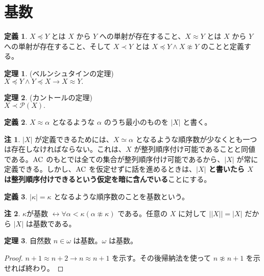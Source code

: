 \documentclass{jsarticle}
\theoremstyle{definition}
\newtheorem*{definition*}{定義}
\newtheorem{theorem}{定理}[section]
\newtheorem{remark}{注}[section]
\begin{document}
    \section{基数}
    \begin{definition*}
        $X \preceq Y$ とは $X$ から $Y$ への単射が存在すること、$X \approx Y$ とは $X$ から $Y$ への単射が存在すること、そして $X \prec Y$ とは $X \preceq Y \land X \not\approx Y$ のことと定義する。
    \end{definition*}
    \begin{theorem} \label{Bernstein} (ベルンシュタインの定理) \\
        $X \preceq Y \land Y \preceq X \rightarrow X \approx Y.$ 
    \end{theorem}
    \begin{theorem} \label{Cantor} (カントールの定理) \\
        $X \prec \mathcal{P}(X).$ 
    \end{theorem}
    \vspace{1ex}
    
    \begin{definition*}
        $X \approx \alpha$ となるような $\alpha$ のうち最小のものを $|X|$ と書く。
    \end{definition*}
    \begin{remark}
        $|X|$ が定義できるためには、$X \simeq \alpha$ となるような順序数が少なくとも一つは存在しなければならない。これは、$X$ が整列順序付け可能であることと同値である。$\rm AC$ のもとでは全ての集合が整列順序付け可能であるから、$|X|$ が常に定義できる。しかし、$\rm AC$ を仮定せずに話を進めるときは、{\bf $|X|$ と書いたら $X$ は整列順序付けできるという仮定を暗に含んでいる}ことにする。
    \end{remark}
    \begin{definition*}
        $|\kappa| = \kappa$ となるような順序数のことを基数という。
    \end{definition*}
    \begin{remark}
        $\kappa$が基数 $\leftrightarrow \forall \alpha < \kappa(\alpha \not\approx \kappa)$ である。任意の $X$ に対して $||X|| = |X|$ だから $|X|$ は基数である。
    \end{remark}
    \vspace{1ex}
    
    \begin{theorem}
        自然数 $n \in \omega$ は基数。$\omega$ は基数。
    \end{theorem}
    \begin{proof}
        $n+1 \approx n+2 \rightarrow n \approx n+1$ を示す。その後帰納法を使って $n \not\approx n+1$ を示せれば終わり。
    \end{proof}
    
\end{document}
